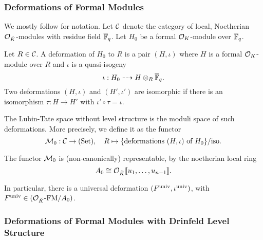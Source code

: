 \subsubsection{Deformations of Formal Modules} %
\label{subsub:Deformations of Formal Modules}
We mostly follow \cite[Chapter 2]{Strauch2008DefSp} for notation. Let $\mathcal{C}$
denote the category of local, Noetherian $\mathcal{O}_{\breve {K}}$-modules with residue field
$\overline {\mathbb{F}}_q$. Let $H_0$ be a formal $\mathcal{O}_K$-module over $\overline {\mathbb{F}}_q$. 
\begin{defi}[Deformation]
  Let $R \in \mathcal{C}$. A deformation of $H_0$ to $R$ is a pair $(H, \iota)$ where
  $H$ is a formal $\mathcal{O}_K$-module over $R$ and $\iota$ is a quasi-isogeny
  \begin{equation*}
    \iota: H_0 \dashrightarrow H \otimes_R {\overline {\mathbb{F}}_q}.
  \end{equation*}
  Two deformations $(H, \iota)$ and $(H', \iota')$ are isomorphic if there is
  an isomorphism $\tau: H \to H'$ with $\iota' \circ \tau = \iota$. 
\end{defi}
The Lubin-Tate space without level structure is the moduli space of such deformations.
More precisely, we define it as the functor
\begin{equation*}
  \mathcal{M}_0: \mathcal{C} \to {(\mathrm{Set})}, \quad R \mapsto \{\text{deformations } (H, \iota) \text{
  of $H_0$}\}/\text{iso}.
\end{equation*}

\begin{thm}[Representability of $\cM_0$]
  The functor $\cM_0$ is (non-canonically) representable, by the noetherian
  local ring
  \begin{equation*}
    A_0 \cong \mathcal{O}_{\breve {K}}\llbracket u_1, \dots, u_{n-1} \rrbracket.
  \end{equation*}
\end{thm}
In particular, there is a universal deformation
$(F^{\mathrm{univ}}, \iota^{\mathrm{univ}})$, with $F^{\mathrm{univ}} \in {({\mathcal{O}_{\breve {K}}}\text-\allowbreak\mathrm{FM}/{A_0})}$.

\subsubsection{Deformations of Formal Modules with Drinfeld Level Structure} 

